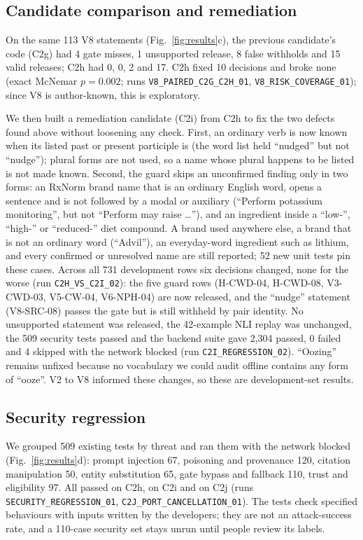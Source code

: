 \documentclass[conference]{IEEEtran}
\begin{document}
\subsection{Candidate comparison and remediation}

On the same 113 V8 statements (Fig.~\ref{fig:results}c), the previous candidate's code (C2g) had 4 gate misses, 1 unsupported release, 8 false
withholds and 15 valid releases; C2h had 0, 0, 2 and 17. C2h fixed 10 decisions and broke none (exact McNemar
$p=0.002$; runs \texttt{V8\_PAIRED\_C2G\_C2H\_01}, \texttt{V8\_RISK\_COVERAGE\_01}); since V8 is author-known,
this is exploratory.

We then built a remediation candidate (C2i) from C2h to fix the two defects found above without loosening any check.
First, an ordinary verb is now known when its listed past or present participle is (the word list held ``nudged'' but
not ``nudge''); plural forms are not used, so a name whose plural happens to be listed is not made known. Second, the
guard skips an unconfirmed finding only in two forms: an RxNorm brand name that is an ordinary English word, opens a
sentence and is not followed by a modal or auxiliary (``Perform potassium monitoring'', but not ``Perform may raise
\dots''), and an ingredient inside a ``low-'', ``high-'' or ``reduced-'' diet compound. A brand used anywhere else, a
brand that is not an ordinary word (``Advil''), an everyday-word ingredient such as lithium, and every confirmed or
unresolved name are still reported; 52 new unit tests pin these cases. Across all 731 development rows six decisions
changed, none for the worse (run \texttt{C2H\_VS\_C2I\_02}): the five guard rows (H-CWD-04, H-CWD-08, V3-CWD-03,
V5-CW-04, V6-NPH-04) are now released, and the ``nudge'' statement (V8-SRC-08) passes the gate but is still withheld
by pair identity. No unsupported statement
was released, the 42-example NLI replay was unchanged, the 509 security tests passed and the backend suite gave
2{,}304 passed, 0 failed and 4 skipped with the network blocked (run \texttt{C2I\_REGRESSION\_02}). ``Oozing'' remains unfixed because no vocabulary we could audit offline contains any form of ``ooze''.
V2 to V8 informed these changes, so these are development-set results.



\subsection{Security regression}

We grouped 509 existing tests by threat and ran them with the network blocked (Fig.~\ref{fig:results}d): prompt injection 67, poisoning and
provenance 120, citation manipulation 50, entity substitution 65, gate bypass and fallback 110, trust and
eligibility 97. All passed on C2h, on C2i and on C2j (runs \texttt{SECURITY\_REGRESSION\_01},
\texttt{C2J\_PORT\_CANCELLATION\_01}). The tests check specified behaviours with inputs written by the developers; they are not an attack-success rate,
and a 110-case security set stays unrun until people review its labels.
\end{document}
